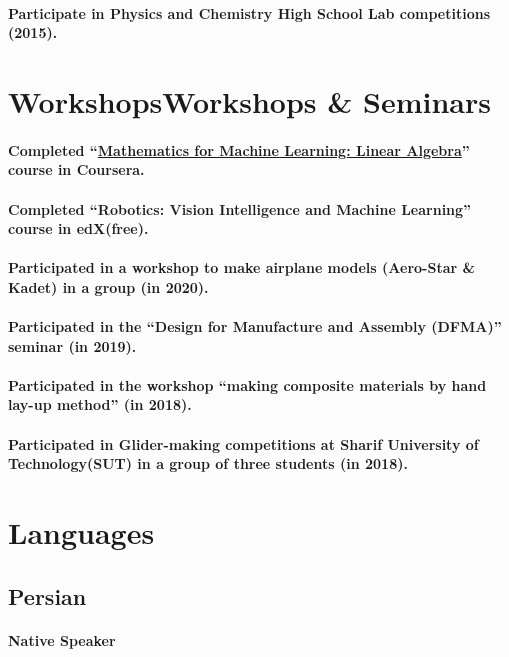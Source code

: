 \documentclass[a4paper]{article}
\begin{document}
        \paragraph{Participate in Physics and Chemistry High School Lab competitions (2015).}
    \section{WorkshopsWorkshops \& Seminars}
        \paragraph{Completed “\href{https://coursera.org/share/727feebde54da2fa7042a84ce71c53e7}{Mathematics for Machine Learning: Linear Algebra}” course in Coursera.}
        \paragraph{Completed “Robotics: Vision Intelligence and Machine Learning” course in edX(free).}
        \paragraph{Participated in a workshop to make airplane models (Aero-Star \& Kadet) in a group (in 2020).}
        \paragraph{Participated in the “Design for Manufacture and Assembly (DFMA)” seminar (in 2019).}
        \paragraph{Participated in the workshop “making composite materials by hand lay-up method” (in 2018).}
        \paragraph{Participated in Glider-making competitions at Sharif University of Technology(SUT) in a group of three students (in 2018).}
    \section{Languages}
    \subsection{Persian}
        \paragraph{Native Speaker}
\end{document}
